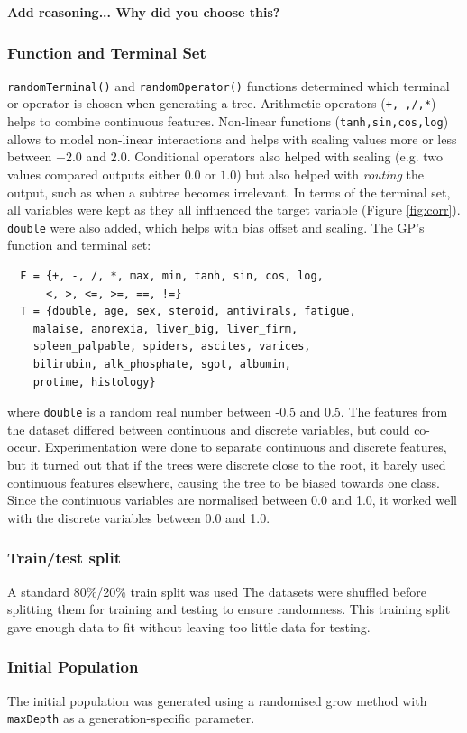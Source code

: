 \documentclass{article}
\begin{document}
\textbf{Add reasoning... Why did you choose this?}

\subsubsection{Function and Terminal Set}
\texttt{randomTerminal()} and \texttt{randomOperator()} functions determined which terminal or operator is chosen when generating a tree. Arithmetic operators (\texttt{+,-,/,*}) helps to combine continuous features. Non-linear functions (\texttt{tanh,sin,cos,log}) allows to model non-linear interactions and helps with scaling values more or less between \(-2.0\) and \(2.0\). Conditional operators also helped with scaling (e.g. two values compared outputs either \(0.0\) or \(1.0\)) but also helped with \emph{routing} the output, such as when a subtree becomes irrelevant.
In terms of the terminal set, all variables were kept as they all influenced the target variable (Figure \ref{fig:corr}). \texttt{double} were also added, which helps with bias offset and scaling. The GP's function and terminal set:
\begin{verbatim}
  F = {+, -, /, *, max, min, tanh, sin, cos, log, 
      <, >, <=, >=, ==, !=}
  T = {double, age, sex, steroid, antivirals, fatigue,
    malaise, anorexia, liver_big, liver_firm,
    spleen_palpable, spiders, ascites, varices,
    bilirubin, alk_phosphate, sgot, albumin,
    protime, histology}
\end{verbatim}
where \texttt{double} is a random real number between -0.5 and 0.5. The features from the dataset differed between continuous and discrete variables, but could co-occur. Experimentation were done to separate continuous and discrete features, but it turned out that if the trees were discrete close to the root, it barely used continuous features elsewhere, causing the tree to be biased towards one class. Since the continuous variables are normalised between 0.0 and 1.0, it worked well with the discrete variables between 0.0 and 1.0.

\subsubsection{Train/test split}
A standard 80\%/20\% train split was used The datasets were shuffled before splitting them for training and testing to ensure randomness. This training split gave enough data to fit without leaving too little data for testing.

\subsubsection{Initial Population}
\label{initPop}
The initial population was generated using a randomised grow method with \texttt{maxDepth} as a generation-specific parameter.
\end{document}
